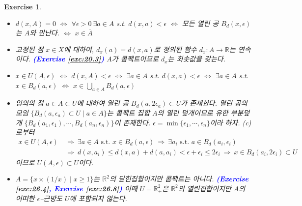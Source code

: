 \documentclass{article}
\newtheorem{exercise}{Exercise}[section]
\newcommand{\R}{\mathbb{R}}
\begin{document}
\begin{exercise}
    \phantom{}
    \begin{itemize}
        \item[(a)] $d(x,A)=0$ $\Longleftrightarrow$ $\forall\epsilon>0~\exists a\in A$ s.t. $d(x,a)<\epsilon$ $\Longleftrightarrow$ 모든 열린 공 $B_d(x,\epsilon)$는 $A$와 만난다. $\Longleftrightarrow$ $x\in\overline{A}$
        \item[(b)] 고정된 점 $x\in X$에 대하여, $d_x(a)=d(x,a)$로 정의된 함수 $d_x:A\to \R$는 연속이다. \textcolor{blue}{\textbf{(Exercise \ref{exc:20.3})}} $A$가 콤팩트이므로 $d_x$는 최솟값을 갖는다.
        \item[(c)] $x\in U(A,\epsilon)$ $\Longleftrightarrow$ $d(x,A)<\epsilon$ $\Longleftrightarrow$ $\exists a\in A$ s.t. $d(x,a)<\epsilon$ $\Longleftrightarrow$ $\exists a\in A$ s.t. $x\in B_d(a,\epsilon)$ $\Longleftrightarrow$ $x\in\bigcup_{a\in A}B_d(a,\epsilon)$
        \item[(d)] 임의의 점 $a\in A\subset U$에 대하여 열린 공 $B_d(a,2\epsilon_a)\subset U$가 존재한다. 열린 공의 모임 $\{B_d(a,\epsilon_a)\subset U\mid a\in A\}$는 콤팩트 집합 $A$의 열린 덮개이므로 유한 부분덮개 $\{B_d(a_1,\epsilon_1),\cdots,B_d(a_n,\epsilon_n)\}$이 존재한다. $\epsilon=\min\{\epsilon_1,\cdots,\epsilon_n\}$이라 하자. (c)로부터
            \begin{align}
                x\in U(A,\epsilon)~&\Longrightarrow~\exists a\in A\text{ s.t. }x\in B_d(a,\epsilon)~\Longrightarrow~\exists a_i\text{ s.t. }a\in B_d(a_i,\epsilon_i)\\
                &\Longrightarrow~d(x,a_i)\leq d(x,a)+d(a,a_i)<\epsilon+\epsilon_i\leq2\epsilon_i~\Longrightarrow~x\in B_d(a_i,2\epsilon_i)\subset U
            \end{align}
            이므로 $U(A,\epsilon)\subset U$이다.
        \item[(e)] $A=\{x\times(1/x)\mid x\geq1\}$는 $\R^2$의 닫힌집합이지만 콤팩트는 아니다. \textcolor{blue}{\textbf{(Exercise \ref{exc:26.4}, Exercise \ref{exc:26.8})}} 이때 $U=\R_+^2$은 $\R^2$의 열린집합이지만 $A$의 어떠한 $\epsilon$--근방도 $U$에 포함되지 않는다.
    \end{itemize}
\end{exercise}
\end{document}
